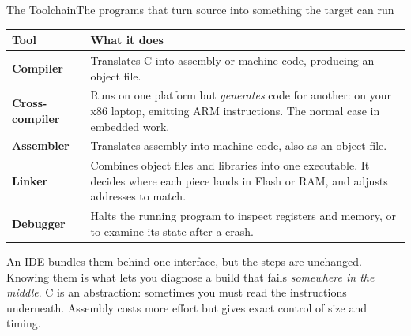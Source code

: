 \documentclass[9pt,aspectratio=169,xcolor=table]{beamer}
\begin{document}
\begin{frame}{The Toolchain}{The programs that turn source into something the target can run}
    \begin{center}
    {\small
    \striped
    \begin{tabular}{@{}l R{.68\textwidth}@{}}
        \toprule
        \textbf{Tool} & \textbf{What it does} \\
        \midrule
        \textbf{Compiler} & Translates C into assembly or machine code, producing an object file. \\
        \textbf{Cross-compiler} & Runs on one platform but \emph{generates} code for another: on your x86 laptop, emitting ARM instructions. The normal case in embedded work. \\
        \textbf{Assembler} & Translates assembly into machine code, also as an object file. \\
        \textbf{Linker} & Combines object files and libraries into one executable. It decides where each piece lands in Flash or RAM, and adjusts addresses to match. \\
        \textbf{Debugger} & Halts the running program to inspect registers and memory, or to examine its state after a crash. \\
        \bottomrule
    \end{tabular}}
    \end{center}

    \vspace{2mm}
    {\small An \alert{IDE} bundles them behind one interface, but the steps are unchanged. Knowing them is what lets you diagnose a build that fails \emph{somewhere in the middle}. C is an abstraction: sometimes you must read the instructions underneath. Assembly costs more effort but gives exact control of size and timing.}
\end{frame}
\end{document}
